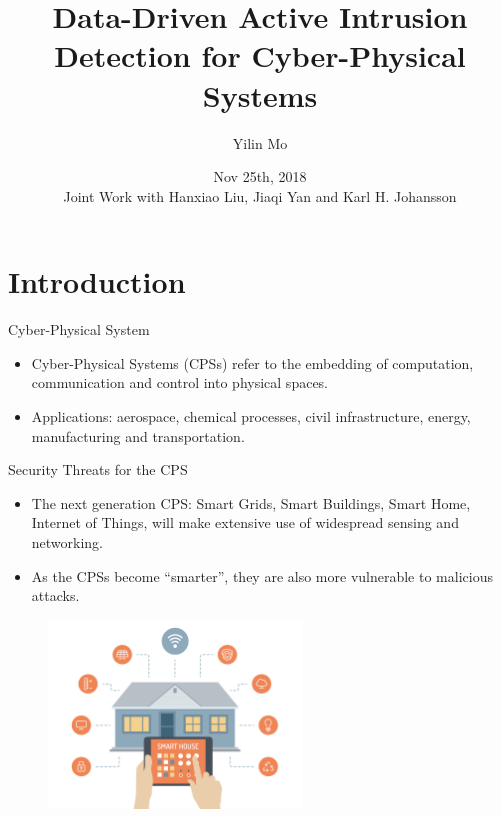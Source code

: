 \documentclass[10pt]{beamer}
\title[Secure CPS]{Data-Driven Active Intrusion Detection for Cyber-Physical Systems}
\author[Yilin Mo]{Yilin Mo}
\institute[Tsinghua]{
  Department of Automation\\ Tsinghua University\\
}
\date[Nov 25, 2018]{ Nov 25th, 2018\\ 
  \small Joint Work with Hanxiao Liu, Jiaqi Yan and Karl H. Johansson}
\begin{document}
\maketitle 

\section{Introduction}

\begin{frame}{Cyber-Physical System}
  \begin{itemize}
  \item Cyber-Physical Systems (CPSs) refer to the embedding of computation, communication and control into physical spaces.
    \begin{center}
    \end{center}
  \item Applications: aerospace, chemical processes, civil infrastructure, energy, manufacturing and transportation. 
  \end{itemize}
\end{frame}

\begin{frame}{Security Threats for the CPS}
  \begin{itemize}
  \item The next generation CPS: Smart Grids, Smart Buildings, Smart Home, Internet of Things, will make extensive use of widespread sensing and networking.
  \item As the CPSs become ``smarter'', they are also more vulnerable to malicious attacks.
  \end{itemize}
  \begin{figure}[ht]
    \centering
    \includegraphics[width=0.6\textwidth]{SmartHome.jpg}
  \end{figure}
\end{frame}
\end{document}
